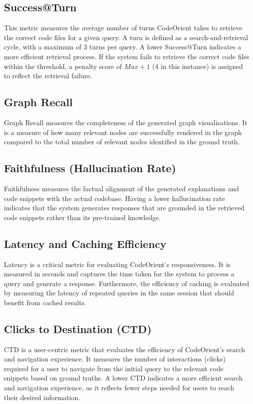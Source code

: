 \subsection{Success@Turn}
This metric measures the average number of turns CodeOrient takes to retrieve the correct code files for a given query. A turn is defined as a search-and-retrieval cycle, with a maximum of 3 turns per query. A lower Success@Turn indicates a more efficient retrieval process. If the system fails to retrieve the correct code files within the threshold, a penalty score of $Max + 1$ (4 in this instance) is assigned to reflect the retrieval failure.
\subsection{Graph Recall}
Graph Recall measures the completeness of the generated graph visualisations. It is a measure of how many relevant nodes are successfully rendered in the graph compared to the total number of relevant nodes identified in the ground truth.
\subsection{Faithfulness (Hallucination Rate)}
Faithfulness measures the factual alignment of the generated explanations and code snippets with the actual codebase. Having a lower hallucination rate indicates that the system generates responses that are grounded in the retrieved code snippets rather than its pre-trained knowledge.
\subsection{Latency and Caching Efficiency}
Latency is a critical metric for evaluating CodeOrient's responsiveness. It is measured in seconds and captures the time taken for the system to process a query and generate a response. Furthermore, the efficiency of caching is evaluated by measuring the latency of repeated queries in the same session that should benefit from cached results.
\subsection{Clicks to Destination (CTD)}
CTD is a user-centric metric that evaluates the efficiency of CodeOrient's search and navigation experience. It measures the number of interactions (clicks) required for a user to navigate from the initial query to the relevant code snippets based on ground truths. A lower CTD indicates a more efficient search and navigation experience, as it reflects fewer steps needed for users to reach their desired information.